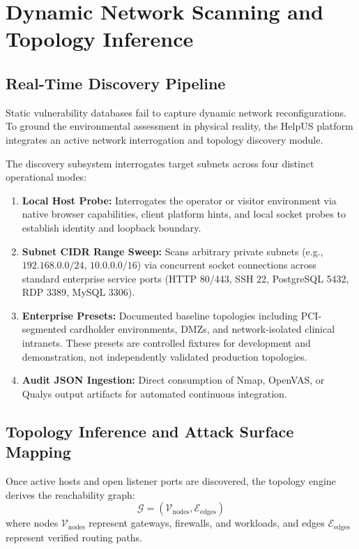 \chapter{Dynamic Network Scanning and Topology Inference}
\label{chap:network_scanner}

\section{Real-Time Discovery Pipeline}
Static vulnerability databases fail to capture dynamic network reconfigurations. To ground the environmental assessment in physical reality, the HelpUS platform integrates an active network interrogation and topology discovery module.

The discovery subsystem interrogates target subnets across four distinct operational modes:
\begin{enumerate}
    \item \textbf{Local Host Probe:} Interrogates the operator or visitor environment via native browser capabilities, client platform hints, and local socket probes to establish identity and loopback boundary.
    \item \textbf{Subnet CIDR Range Sweep:} Scans arbitrary private subnets (e.g., $192.168.0.0/24$, $10.0.0.0/16$) via concurrent socket connections across standard enterprise service ports (HTTP 80/443, SSH 22, PostgreSQL 5432, RDP 3389, MySQL 3306).
    \item \textbf{Enterprise Presets:} Documented baseline topologies including PCI-segmented cardholder environments, DMZs, and network-isolated clinical intranets. These presets are controlled fixtures for development and demonstration, not independently validated production topologies.
    \item \textbf{Audit JSON Ingestion:} Direct consumption of Nmap, OpenVAS, or Qualys output artifacts for automated continuous integration.
\end{enumerate}

\section{Topology Inference and Attack Surface Mapping}
Once active hosts and open listener ports are discovered, the topology engine derives the reachability graph:
\begin{equation}
    \mathcal{G} = (\mathcal{V}_{\text{nodes}}, \mathcal{E}_{\text{edges}})
\end{equation}
where nodes $\mathcal{V}_{\text{nodes}}$ represent gateways, firewalls, and workloads, and edges $\mathcal{E}_{\text{edges}}$ represent verified routing paths.

